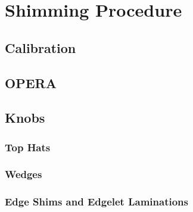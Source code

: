 \section{Shimming Procedure} \label{sec:Shimming-Procedure}


\subsection{Calibration}

\subsection{OPERA}

\subsection{Knobs}

\subsubsection{Top Hats}

\subsubsection{Wedges}

\subsubsection{Edge Shims and Edgelet Laminations}

